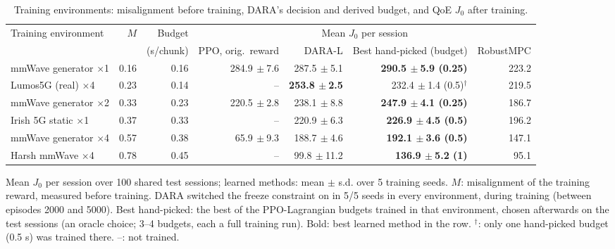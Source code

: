 \begin{table}[t]
\centering
\caption{Training environments: misalignment before training, DARA's decision and derived budget, and QoE $J_0$ after training.}
\label{tab:envs}
\footnotesize
\setlength{\tabcolsep}{4pt}
\begin{tabular}{lrrrrrr}
\toprule
Training environment & $M$ & Budget & \multicolumn{4}{c}{Mean $J_0$ per session} \\
\cmidrule(lr){4-7}
 & & (s/chunk) & PPO, orig.\ reward & DARA-L & Best hand-picked (budget) & RobustMPC \\
\midrule
mmWave generator $\times$1 & 0.16 & 0.16 & 284.9{\tiny$\,\pm$7.6} & 287.5{\tiny$\,\pm$5.1} & \textbf{290.5{\tiny$\,\pm$5.9} (0.25)} & 223.2 \\
Lumos5G (real) $\times$4 & 0.23 & 0.14 & -- & \textbf{253.8{\tiny$\,\pm$2.5}} & 232.4{\tiny$\,\pm$1.4} (0.5)$^\dagger$ & 219.5 \\
mmWave generator $\times$2 & 0.33 & 0.23 & 220.5{\tiny$\,\pm$2.8} & 238.1{\tiny$\,\pm$8.8} & \textbf{247.9{\tiny$\,\pm$4.1} (0.25)} & 186.7 \\
Irish 5G static $\times$1 & 0.37 & 0.33 & -- & 220.9{\tiny$\,\pm$6.3} & \textbf{226.9{\tiny$\,\pm$4.5} (0.5)} & 196.2 \\
mmWave generator $\times$4 & 0.57 & 0.38 & 65.9{\tiny$\,\pm$9.3} & 188.7{\tiny$\,\pm$4.6} & \textbf{192.1{\tiny$\,\pm$3.6} (0.5)} & 147.1 \\
Harsh mmWave $\times$4 & 0.78 & 0.45 & -- & 99.8{\tiny$\,\pm$11.2} & \textbf{136.9{\tiny$\,\pm$5.2} (1)} & 95.1 \\
\bottomrule
\end{tabular}

\vspace{2pt}\parbox{\textwidth}{\scriptsize Mean $J_0$ per session over 100 shared test sessions; learned methods: mean $\pm$ s.d. over 5 training seeds. $M$: misalignment of the training reward, measured before training. DARA switched the freeze constraint on in 5/5 seeds in every environment, during training (between episodes 2000 and 5000). Best hand-picked: the best of the PPO-Lagrangian budgets trained in that environment, chosen afterwards on the test sessions (an oracle choice; 3--4 budgets, each a full training run). Bold: best learned method in the row. $^\dagger$: only one hand-picked budget (0.5 s) was trained there. --: not trained.}
\end{table}
